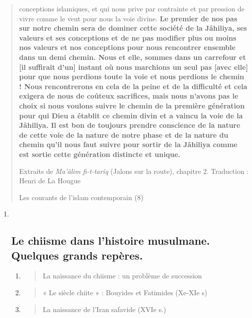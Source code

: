 \begin{quote}
conceptions islamiques, et qui nous prive par contrainte et par pression
de vivre comme le veut pour nous la voie divine. \textbf{Le premier de
nos pas sur notre chemin sera de dominer cette société de la Jâhiliya,
ses valeurs et ses conceptions et de ne pas modifier plus ou moins nos
valeurs et nos conceptions pour nous rencontrer ensemble dans un demi
chemin. Nous et elle, sommes dans un carrefour et {[}il suffirait
d'un{]} instant où nous marchions un seul pas {[}avec elle{]} pour que
nous perdions toute la voie et nous perdions le chemin ! Nous
rencontrerons en cela de la peine et de la difficulté et cela exigera de
nous de coûteux sacrifices, mais nous n'avons pas le choix si nous
voulons suivre le chemin de la première génération pour qui Dieu a
établit ce chemin divin et a vaincu la voie de la Jâhiliya. Il est bon
de toujours prendre conscience de la nature de cette voie de la nature
de notre phase et de la nature du chemin qu'il nous faut suivre pour
sortir de la Jâhiliya comme est sortie cette génération distincte et
unique.}

Extraits de \emph{Ma'âlim fi-t-tarîq} (Jalons sur la route), chapitre 2.
Traduction : Henri de La Hougue

Les courants de l'islam contemporain (8)
\end{quote}

\begin{enumerate}
\def\labelenumi{\Roman{enumi}.}
\item ~
  \hypertarget{le-chiisme-dans-lhistoire-musulmane.-quelques-grands-repuxe8res.}{%
  \subsection{\texorpdfstring{{Le chiisme dans l'histoire
  musulmane. Quelques grands
  repères.}}{Le chiisme dans l'histoire musulmane. Quelques grands repères.}}\label{le-chiisme-dans-lhistoire-musulmane.-quelques-grands-repuxe8res.}}

  \begin{enumerate}
  \def\labelenumii{\arabic{enumii}.}
  \item
    \begin{quote}
    La naissance du chiisme : un problème de succession
    \end{quote}
  \item
    \begin{quote}
    « Le siècle chiite » : Bouyides et Fatimides (Xe-XIe s)
    \end{quote}
  \item
    \begin{quote}
    La naissance de l'Iran safavide (XVIe s.)
    \end{quote}
  \end{enumerate}
\end{enumerate}

